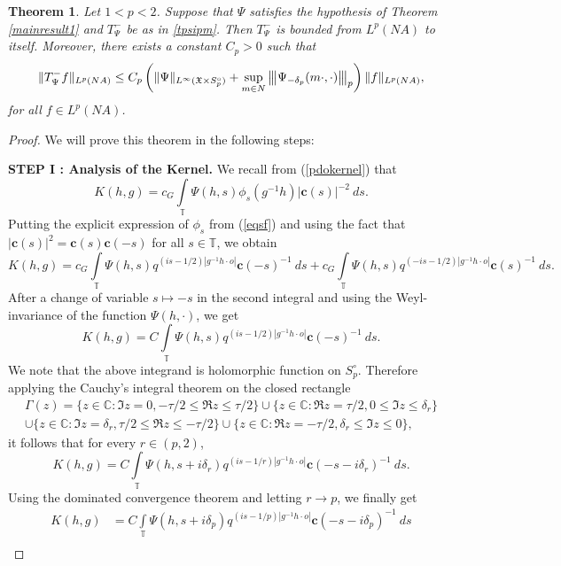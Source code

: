 \documentclass[12pt,reqno]{amsart}
\newcommand{\vertiii}[1]{{\left\vert\kern-0.25ex\left\vert\kern-0.25ex\left\vert #1 
		\right\vert\kern-0.25ex\right\vert\kern-0.25ex\right\vert}}
\newcommand{\T}{\mathbb{T}}
\newtheorem{theorem}{Theorem}[section]
\theoremstyle{definition}
\theoremstyle{definition}
\numberwithin{equation}{section}
\begin{document}
\begin{theorem}\label{tpsiminus}
Let $1<p<2$. Suppose that $\Psi$ satisfies the hypothesis of Theorem \ref{mainresult1} and $T_{\Psi}^{-}$ be as in \eqref{tpsipm}. Then $T_{\Psi}^{-}$ is bounded from $L^{p}(NA)$ to itself. Moreover, there exists a constant $C_{p}>0$ such that
$$\|T_{\Psi}^{-}f\|_{L^{p}(NA)}\leq C_{p}\left(\|\Psi\|_{L^{\infty}(\mathfrak{X}\times S^{\circ}_{p})}+\sup\limits_{m\in N}\vertiii{\Psi_{-\delta_{p}}(m\cdot,\cdot)}_{p}\right) \|f\|_{L^{p}(NA)},$$
for all $f\in L^{p}(NA)$.
\end{theorem}
\begin{proof}
We will prove this theorem in the following steps:

\noindent \textbf{STEP I : Analysis of the Kernel.} We recall from (\ref{pdokernel}) that
$$K(h,g)=c_{G}\int\limits_{\mathbb{T}}\Psi(h,s)\phi_{s}(g^{-1}h)|\mathbf{c}(s)|^{-2}~ds.$$
Putting the explicit expression of $\phi_{s}$ from (\ref{eqsf}) and using the fact that $|\mathbf{c}(s)|^{2}=\mathbf{c}(s)\mathbf{c}(-s)$ for all $s\in\T$, we obtain
$$K(h,g)=c_{G}\int\limits_{\mathbb{T}}\Psi(h,s)q^{(is-1/2)|g^{-1}h\cdot o|}\mathbf{c}(-s)^{-1}~ds+c_{G}\int\limits_{\mathbb{T}}\Psi(h,s)q^{(-is-1/2)|g^{-1}h\cdot o|}\mathbf{c}(s)^{-1}~ds.$$
After a change of variable $s\mapsto -s$ in the second integral and using the Weyl-invariance of the function $\Psi(h,\cdot)$, we get
\begin{equation}\label{eqn_expression_of_K_1st}
	K(h,g)=C\int\limits_{\mathbb{T}}\Psi(h,s)q^{(is-1/2)|g^{-1}h\cdot o|}\mathbf{c}(-s)^{-1}~ds.
\end{equation}
We note that the above integrand is holomorphic function on $S^{\circ}_{p}$. Therefore applying the Cauchy's integral theorem on the closed rectangle
\begin{multline*}
		\Gamma(z)=\{z\in\mathbb{C}:\Im z=0,-\tau/2\leq \Re z\leq\tau/2\}\cup\{z\in\mathbb{C}: \Re z=\tau/2,0\leq \Im z\leq\delta_{r}\}\\
		\cup\{z\in\mathbb{C}:\Im z=\delta_{r},\tau/2\leq \Re z\leq-\tau/2\}\cup\{z\in\mathbb{C}:\Re z=-\tau/2,\delta_{r}\leq \Im z\leq 0\},
\end{multline*}
	it follows that for every $r\in(p,2)$,
	$$K(h,g)=C\int\limits_{\mathbb{T}}\Psi(h,s+i\delta_{r})q^{(is-1/r)|g^{-1}h\cdot o|}\mathbf{c}(-s-i\delta_{r})^{-1}~ds.$$
Using the dominated convergence theorem and letting $r\rightarrow p$, we finally get
	\begin{align*}
		K(h,g)&=C\int\limits_{\mathbb{T}}\Psi(h,s+i\delta_{p})q^{(is-1/p)|g^{-1}h\cdot o|}\mathbf{c}(-s-i\delta_{p})^{-1}~ds\\

\end{align*}
\end{proof}
\end{document}
